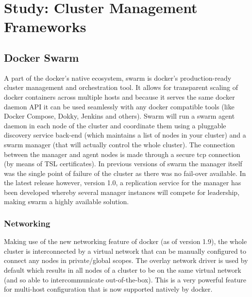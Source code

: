\documentclass{article}
\begin{document}
\section{Study: Cluster Management Frameworks}
\lipsum[1]

\subsection{Docker Swarm}
A part of the docker's native ecosystem, swarm is docker's production-ready cluster management and orchestration tool. It allows for transparent scaling of docker containers across multiple hosts and because it serves the same docker daemon API it can be used seamlessly with any docker compatible tools (like Docker Compose, Dokky, Jenkins and others).
Swarm will run a swarm agent daemon in each node of the cluster and coordinate them using a pluggable discovery service back-end (which maintains a list of nodes in your cluster) and a swarm manager (that will actually control the whole cluster). The connection between the manager and agent nodes is made through a secure tcp connection (by means of TSL certificates). In previous versions of swarm the manager itself was the single point of failure of the cluster as there was no fail-over available. In the latest release however, version 1.0, a replication service for the manager has been developed whereby several manager instances will compete for leadership, making swarm a highly available solution.
\subsubsection{Networking}
Making use of the new networking feature of docker (as of version 1.9), the whole cluster is interconnected by a virtual network that can be manually configured to connect any nodes in private/global scopes. The overlay network driver is used by default which results in all nodes of a cluster to be on the same virtual network (and so able to intercommunicate out-of-the-box). This is a very powerful feature for multi-host configuration that is now supported natively by docker.
\end{document}

